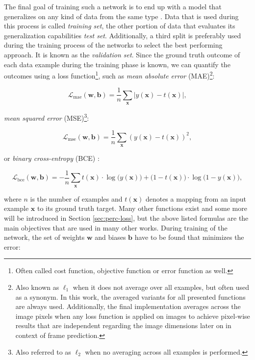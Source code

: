 The final goal of training such a network is to end up with a model that generalizes on any kind of data from the same type \parencite[p. 2]{pattern_and_ml}. Data that is used during this process is called \textit{training set}, the other portion of data that evaluates its generalization capabilities \textit{test set}. Additionally, a third split is preferably used during the training process of the networks to select the best performing approach. It is known as the \textit{validation set}. Since the ground truth outcome of each data example during the training phase is known, we can quantify the outcomes using a loss function\footnote{Often called cost function, objective function or error function as well.}, such as \textit{mean absolute error} (MAE)\footnote{Also known as $ \ell_1 $ when it does not average over all examples, but often used as a synonym. In this work, the averaged variants for all presented functions are always used. Additionally, the final implementation averages across the image pixels when any loss function is applied on images to achieve pixel-wise results that are independent regarding the image dimensions later on in context of frame prediction.}:

\begin{equation} \label{eq:mae}
  \mathcal{L}_{\textrm{mae}}(\textbf{w}, \textbf{b})=\frac{1}{n} \sum\limits_{\textbf{x}} | y(\textbf{x}) - t(\textbf{x}) | ,
\end{equation}

\textit{mean squared error} (MSE)\footnote{Also referred to as $ \ell_2 $ when no averaging across all examples is performed.}:

\begin{equation} \label{eq:mse}
  \mathcal{L}_{\textrm{mse}}(\textbf{w}, \textbf{b})=\frac{1}{n} \sum\limits_{\textbf{x}} ( y(\textbf{x}) - t(\textbf{x}) )^2 ,
\end{equation}

or \textit{binary cross-entropy} (BCE) \parencite{conv_lstm_nowcasting}:

\begin{equation} \label{eq:bce}
  \mathcal{L}_{\textrm{bce}}(\textbf{w}, \textbf{b})= -\frac{1}{n} \sum\limits_{\textbf{x}} t(\textbf{x}) \cdot \log{\big(y(\textbf{x})\big)} + \big(1-t(\textbf{x})\big) \cdot \log{\big(1-y(\textbf{x})\big)} ,
\end{equation}

where $ n $ is the number of examples and $ t(\textbf{x}) $ denotes a mapping from an input example $ \textbf{x} $ to its ground truth target. Many other functions exist and some more will be introduced in Section \ref{sec:perc-loss}, but the above listed formulas are the main objectives that are used in many other works. During training of the network, the set of weights $ \textbf{w} $ and biases $ \textbf{b} $ have to be found that minimizes the error:

